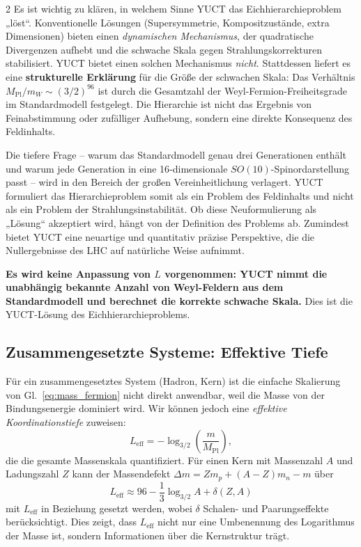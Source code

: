 \documentclass[11pt,a4paper]{article}
\begin{document}
\begin{multicols}{2}
		Es ist wichtig zu klären, in welchem Sinne YUCT das Eichhierarchieproblem „löst“. Konventionelle Lösungen (Supersymmetrie, Kompositzustände, extra Dimensionen) bieten einen \emph{dynamischen Mechanismus}, der quadratische Divergenzen aufhebt und die schwache Skala gegen Strahlungskorrekturen stabilisiert. YUCT bietet einen solchen Mechanismus \emph{nicht}. Stattdessen liefert es eine \textbf{strukturelle Erklärung} für die Größe der schwachen Skala: Das Verhältnis \(M_{\mathrm{Pl}}/m_W \sim (3/2)^{96}\) ist durch die Gesamtzahl der Weyl-Fermion-Freiheitsgrade im Standardmodell festgelegt. Die Hierarchie ist nicht das Ergebnis von Feinabstimmung oder zufälliger Aufhebung, sondern eine direkte Konsequenz des Feldinhalts.
		
		Die tiefere Frage – warum das Standardmodell genau drei Generationen enthält und warum jede Generation in eine 16‑dimensionale \(SO(10)\)-Spinordarstellung passt – wird in den Bereich der großen Vereinheitlichung verlagert. YUCT formuliert das Hierarchieproblem somit als ein Problem des Feldinhalts und nicht als ein Problem der Strahlungsinstabilität. Ob diese Neuformulierung als „Lösung“ akzeptiert wird, hängt von der Definition des Problems ab. Zumindest bietet YUCT eine neuartige und quantitativ präzise Perspektive, die die Nullergebnisse des LHC auf natürliche Weise aufnimmt.
		
		\textbf{Es wird keine Anpassung von $L$ vorgenommen: YUCT nimmt die unabhängig bekannte Anzahl von Weyl-Feldern aus dem Standardmodell und berechnet die korrekte schwache Skala.} Dies ist die YUCT-Lösung des Eichhierarchieproblems.
		
		\subsection{Zusammengesetzte Systeme: Effektive Tiefe}
		
		Für ein zusammengesetztes System (Hadron, Kern) ist die einfache Skalierung von Gl.~\eqref{eq:mass_fermion} nicht direkt anwendbar, weil die Masse von der Bindungsenergie dominiert wird. Wir können jedoch eine \emph{effektive Koordinationstiefe} zuweisen:
		\begin{equation}
			L_{\mathrm{eff}} = -\log_{3/2}\left( \frac{m}{M_{\mathrm{Pl}}} \right),
			\label{eq:Leff}
		\end{equation}
		die die gesamte Massenskala quantifiziert. Für einen Kern mit Massenzahl \(A\) und Ladungszahl \(Z\) kann der Massendefekt \(\Delta m = Z m_p + (A-Z) m_n - m\) über
		\begin{equation}
			L_{\mathrm{eff}} \approx 96 - \frac{1}{3} \log_{3/2} A + \delta(Z,A)
		\end{equation}
		mit \(L_{\mathrm{eff}}\) in Beziehung gesetzt werden, wobei \(\delta\) Schalen- und Paarungseffekte berücksichtigt. Dies zeigt, dass \(L_{\mathrm{eff}}\) nicht nur eine Umbenennung des Logarithmus der Masse ist, sondern Informationen über die Kernstruktur trägt.
		

\end{multicols}
\end{document}
